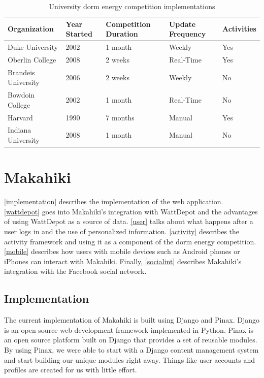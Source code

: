 \begin{table}[h]
	\begin{tabular}{|l||l|l|l|l|}
		\hline
		Organization & Year Started & Competition Duration & Update Frequency & Activities \\
		\hline
		Duke University & 2002 & 1 month & Weekly & Yes \\
		Oberlin College & 2008 & 2 weeks & Real-Time & Yes \\
		Brandeis University & 2006 & 2 weeks & Weekly & No \\
		Bowdoin College & 2002 & 1 month & Real-Time & No \\
		Harvard & 1990\cite{harvard-greencup} & 7 months & Manual & Yes \\
		Indiana University & 2008\cite{indiana-first} & 1 month & Manual & No \\
		\hline
	\end{tabular}
	\caption{University dorm energy competition implementations}
	\label{feature-matrix}
\end{table}

\chapter{Makahiki}
\label{makahiki}

\autoref{implementation} describes the implementation of the web application.  \autoref{wattdepot} goes into Makahiki's integration with WattDepot and the advantages of using WattDepot as a source of data.  \autoref{user} talks about what happens after a user logs in and the use of personalized information.  \autoref{activity} describes the activity framework and using it as a component of the dorm energy competition.  \autoref{mobile} describes how users with mobile devices such as Android phones or iPhones can interact with Makahiki. Finally, \autoref{socialint} describes Makahiki's integration with the Facebook social network.

\section{Implementation}
\label{implementation}

The current implementation of Makahiki is built using Django and Pinax.  Django\cite{django} is an open source web development framework implemented in Python.  Pinax\cite{pinax} is an open source platform built on Django that provides a set of reusable modules.  By using Pinax, we were able to start with a Django content management system and start building our unique modules right away.  Things like user accounts and profiles are created for us with little effort.

